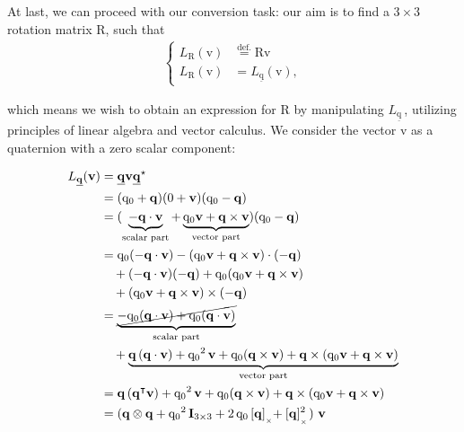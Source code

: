 \setlength{\belowdisplayskip}{0.3cm}

\bigskip
\bigskip 

At last, we can proceed with our conversion task: our aim is to find a $3\times3$ rotation matrix $\bm{\mathrm{R}}$, such that
\begin{align*}
\left\{
    \begin{aligned}
    	L_{\bm{\mathrm{R}}}(\bm{\mathrm{v}}) &\stackrel{\text{def.}}{=} \bm{\mathrm{R}}\bm{\mathrm{v}} \\
        L_{\bm{\mathrm{R}}}(\bm{\mathrm{v}}) &= L_{\underline{\bm{\mathrm{q}}}}(\bm{\mathrm{v}}),
    \end{aligned}
\right.
\end{align*}

\noindent which means we wish to obtain an expression for $\bm{\mathrm{R}}$ by manipulating $L_{\underline{\bm{\mathrm{q}}}}\,$, utilizing principles of linear algebra and vector calculus. We consider the vector $\bm{\mathrm{v}}$ as a quaternion with a zero scalar component:

\begin{align*}
    L_{\underline{\bm{\mathrm{q}}}}(\bm{\mathrm{v}}) &= \underline{\bm{\mathrm{q}}}\bm{\mathrm{v}}\underline{\bm{\mathrm{q}}}^\star \\
    &= (\mathrm{q}_0+\bm{\mathrm{q}})(0+\bm{\mathrm{v}})(\mathrm{q}_0-\bm{\mathrm{q}}) \\
    &= (\underbrace{-\bm{\mathrm{q}}\cdot\bm{\mathrm{v}}}_{\text{scalar part}} + \underbrace{\mathrm{q}_0\bm{\mathrm{v}}+\bm{\mathrm{q}}\times\bm{\mathrm{v}}}_{\text{vector part}})(\mathrm{q}_0-\bm{\mathrm{q}}) \\
    &= \mathrm{q}_0(-\bm{\mathrm{q}}\cdot\bm{\mathrm{v}}) - (\mathrm{q}_0\bm{\mathrm{v}}+\bm{\mathrm{q}}\times\bm{\mathrm{v}})\cdot(-\bm{\mathrm{q}}) \\
    &\quad + (-\bm{\mathrm{q}}\cdot\bm{\mathrm{v}})(-\bm{\mathrm{q}}) + \mathrm{q}_0(\mathrm{q}_0\bm{\mathrm{v}}+\bm{\mathrm{q}}\times\bm{\mathrm{v}}) \\
    &\quad + (\mathrm{q}_0\bm{\mathrm{v}}+\bm{\mathrm{q}}\times\bm{\mathrm{v}})\times(-\bm{\mathrm{q}}) \\
    &= \underbrace{\cancel{-\mathrm{q}_0(\bm{\mathrm{q}}\cdot\bm{\mathrm{v}}) + \mathrm{q}_0(\bm{\mathrm{q}}\cdot\bm{\mathrm{v}})}}_{\text{scalar part}} \\
    &\quad + \underbrace{\bm{\mathrm{q}}\,(\bm{\mathrm{q}}\cdot\bm{\mathrm{v}}) + {\mathrm{q}_0}^2\,\bm{\mathrm{v}} + \mathrm{q}_0(\bm{\mathrm{q}}\times\bm{\mathrm{v}}) + \bm{\mathrm{q}}\times(\mathrm{q}_0\bm{\mathrm{v}}+\bm{\mathrm{q}}\times\bm{\mathrm{v}})}_{\text{vector part}} \\
    &= \bm{\mathrm{q}}\,(\bm{\mathrm{q}}^\intercal\bm{\mathrm{v}}) + {\mathrm{q}_0}^2\,\bm{\mathrm{v}} + \mathrm{q}_0(\bm{\mathrm{q}}\times\bm{\mathrm{v}}) + \bm{\mathrm{q}}\times(\mathrm{q}_0\bm{\mathrm{v}}+\bm{\mathrm{q}}\times\bm{\mathrm{v}}) \\
    &= (\bm{\mathrm{q}}\otimes\bm{\mathrm{q}} + {\mathrm{q}_0}^2\,\bm{\mathrm{I}}_{3\times3} + 2\,\mathrm{q}_0\,[\bm{\mathrm{q}}]_{_{_\times}}\!\! + [\bm{\mathrm{q}}]_{_{_\times}}^2)\,\,\bm{\mathrm{v}}
\end{align*}

